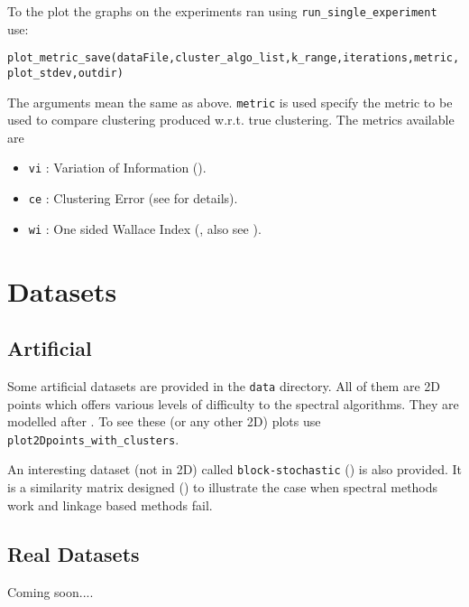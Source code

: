 \documentclass[10pt]{article}
\begin{document}
To the plot the graphs on the experiments ran using
\texttt{run\_single\_experiment} use:

\texttt{plot\_metric\_save(dataFile,cluster\_algo\_list,k\_range,iterations,metric,plot\_stdev,outdir)}

The arguments mean the same as above. \texttt{metric} is used  specify the metric to be used
to compare clustering produced w.r.t. true clustering. The metrics
available are 
\begin{itemize}
\item \texttt{vi} : Variation of Information (\cite{stat418}). 
\item \texttt{ce} : Clustering Error (see \cite{VM03} for details). 
  
\item \texttt{wi} : One sided Wallace Index (\cite{wallas}, also see
  \cite{VM03}). 
  
\end{itemize}



\section{Datasets}
\label{sec:data}


\subsection{Artificial}
\label{sec:artdata}

Some artificial datasets are provided in the \texttt{data}
directory. All of them are 2D points which offers various levels of
difficulty to the spectral algorithms. They are modelled after
\cite{NgJW01}. To see these (or any other 2D) plots use
\texttt{plot2Dpoints\_with\_clusters}. 

An interesting dataset (not in 2D) called \texttt{block-stochastic}
(\cite{MeilaS00}) is also provided. It is a similarity matrix designed
(\cite{VM03}) to illustrate the case when spectral methods work and
linkage based methods fail. 

\subsection{Real Datasets}
\label{sec:realdata}

Coming soon....
\small{
  
  
}
\end{document}
